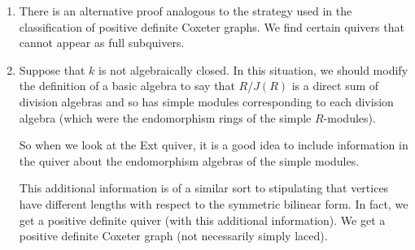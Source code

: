 \begin{enumerate}
	\item There is an alternative proof analogous to the strategy used in
		the classification of positive definite Coxeter graphs. We find
		certain quivers that cannot appear as full subquivers.
	\item Suppose that $k$ is not algebraically closed.  In this situation, we should
		modify the definition of a basic algebra to say that $R/J(R)$ is a direct
		sum of division algebras and so has simple modules corresponding to each
		division algebra (which were the endomorphism rings of the simple $R$-modules).

		So when we look at the Ext quiver, it is a good idea to include information
		in the quiver about the endomorphism algebras of the simple modules.

		This additional information is of a similar sort to stipulating that
		vertices have different lengths with respect to the symmetric
		bilinear form. In fact, we get a positive definite quiver (with this
		additional information). We get a positive definite Coxeter graph (not
		necessarily simply laced).
\end{enumerate}

